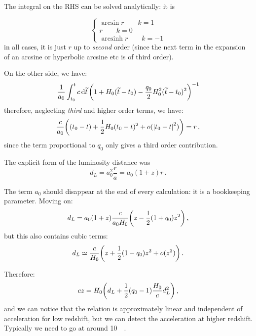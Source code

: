 \documentclass[main.tex]{subfiles}
\begin{document}
The integral on the RHS can be solved analytically: it is 

\begin{equation}
  \begin{cases}
      \arcsin r \qquad k=1 \\
      r \qquad k=0 \\
      \operatorname{arcsinh} r \qquad k = -1
  \end{cases}
\end{equation}
%
in all cases, it is just \(r\) up to \emph{second} order (since the next term in the expansion of an arcsine or hyperbolic arcsine etc is of third order).

On the other side, we have:
\begin{equation}
  \frac{1}{a_0 }
  \int_{t_0 }^t c\dd{\widetilde{t}} \qty(1 + H_0 (\widetilde{t} - t_0) - \frac{q_0}{2}H_0^2 (\widetilde{t} - t_0)^2)^{-1}
\end{equation}
%
therefore, neglecting \emph{third} and higher order terms, we have:
\begin{equation}
  \frac{c}{a_0 } \qty((t_0 - t) + \frac{1}{2} H_0 (t_0 - t)^2 + o(\abs{t_0 - t} ^2)) = r \,,
\end{equation}
%
since the term proportional to \(q_0 \) only gives a third order contribution.

The explicit form of the luminosity distance was
\begin{equation}
  d_L = a_0^2 \frac{r}{a} = a_0 (1+z) r\,.
\end{equation}

The term \(a_0 \) should disappear at the end of every calculation: it is a bookkeeping parameter.
Moving on:
\begin{equation}
  d_L = a_0 (1+z) \frac{c}{a_0 H_0 } \qty(z - \frac{1}{2} (1+ q_0 )z^2)\,,
\end{equation}
%
but this also contains cubic terms:
\begin{equation}
  d_L \simeq \frac{c}{H_0} \qty(z + \frac{1}{2} (1-q_0 ) z^2 + o(z^2))\,.
\end{equation}

Therefore:
\begin{equation}
  cz = H_0 \qty(d_L + \frac{1}{2} (q_0 -1 ) \frac{H_0}{c} d_L^2)\,,
\end{equation}
%
and we can notice that the relation is approximately linear and independent of acceleration for low redshift, but we can detect the acceleration at higher redshift.
Typically we need to go at around \SI{10}{\mega\parsec}.
\end{document}
